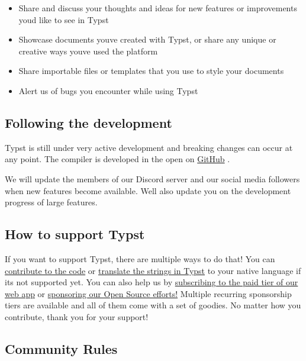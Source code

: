 \begin{itemize}
\tightlist
\item
  Share and discuss your thoughts and ideas for new features or
  improvements you\textquotesingle d like to see in Typst
\item
  Showcase documents you\textquotesingle ve created with Typst, or share
  any unique or creative ways you\textquotesingle ve used the platform
\item
  Share importable files or templates that you use to style your
  documents
\item
  Alert us of bugs you encounter while using Typst
\end{itemize}

\subsection{Following the development}\label{following-the-development}

Typst is still under very active development and breaking changes can
occur at any point. The compiler is developed in the open on
\href{https://github.com/typst/typst}{GitHub} .

We will update the members of our Discord server and our social media
followers when new features become available. We\textquotesingle ll also
update you on the development progress of large features.

\subsection{How to support Typst}\label{support-typst}

If you want to support Typst, there are multiple ways to do that! You
can \href{https://github.com/typst/typst}{contribute to the code} or
\href{https://github.com/search?q=repo\%3Atypst\%2Ftypst+impl+LocalName+for&type=code}{translate
the strings in Typst} to your native language if it\textquotesingle s
not supported yet. You can also help us by
\href{https://typst.app/pricing}{subscribing to the paid tier of our web
app} or \href{https://github.com/sponsors/typst}{sponsoring our Open
Source efforts!} Multiple recurring sponsorship tiers are available and
all of them come with a set of goodies. No matter how you contribute,
thank you for your support!

\subsection{Community Rules}\label{rules}

